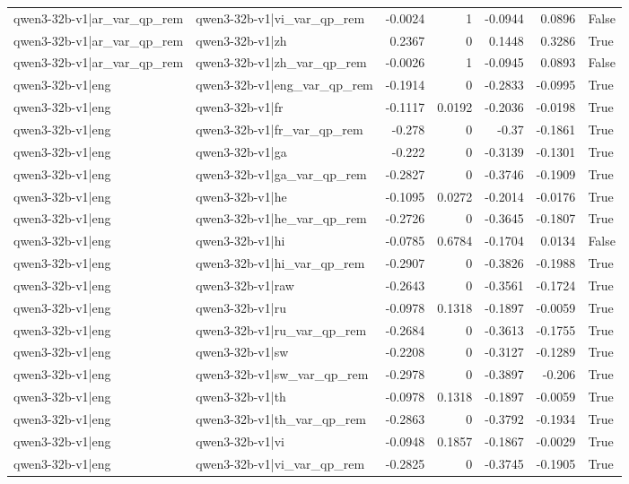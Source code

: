 \begin{table}
\begin{tabular}{l l r r r r l}
qwen3-32b-v1|ar_var_qp_rem & qwen3-32b-v1|vi_var_qp_rem & -0.0024 & 1 & -0.0944 & 0.0896 & False \\
qwen3-32b-v1|ar_var_qp_rem & qwen3-32b-v1|zh & 0.2367 & 0 & 0.1448 & 0.3286 & True \\
qwen3-32b-v1|ar_var_qp_rem & qwen3-32b-v1|zh_var_qp_rem & -0.0026 & 1 & -0.0945 & 0.0893 & False \\
qwen3-32b-v1|eng & qwen3-32b-v1|eng_var_qp_rem & -0.1914 & 0 & -0.2833 & -0.0995 & True \\
qwen3-32b-v1|eng & qwen3-32b-v1|fr & -0.1117 & 0.0192 & -0.2036 & -0.0198 & True \\
qwen3-32b-v1|eng & qwen3-32b-v1|fr_var_qp_rem & -0.278 & 0 & -0.37 & -0.1861 & True \\
qwen3-32b-v1|eng & qwen3-32b-v1|ga & -0.222 & 0 & -0.3139 & -0.1301 & True \\
qwen3-32b-v1|eng & qwen3-32b-v1|ga_var_qp_rem & -0.2827 & 0 & -0.3746 & -0.1909 & True \\
qwen3-32b-v1|eng & qwen3-32b-v1|he & -0.1095 & 0.0272 & -0.2014 & -0.0176 & True \\
qwen3-32b-v1|eng & qwen3-32b-v1|he_var_qp_rem & -0.2726 & 0 & -0.3645 & -0.1807 & True \\
qwen3-32b-v1|eng & qwen3-32b-v1|hi & -0.0785 & 0.6784 & -0.1704 & 0.0134 & False \\
qwen3-32b-v1|eng & qwen3-32b-v1|hi_var_qp_rem & -0.2907 & 0 & -0.3826 & -0.1988 & True \\
qwen3-32b-v1|eng & qwen3-32b-v1|raw & -0.2643 & 0 & -0.3561 & -0.1724 & True \\
qwen3-32b-v1|eng & qwen3-32b-v1|ru & -0.0978 & 0.1318 & -0.1897 & -0.0059 & True \\
qwen3-32b-v1|eng & qwen3-32b-v1|ru_var_qp_rem & -0.2684 & 0 & -0.3613 & -0.1755 & True \\
qwen3-32b-v1|eng & qwen3-32b-v1|sw & -0.2208 & 0 & -0.3127 & -0.1289 & True \\
qwen3-32b-v1|eng & qwen3-32b-v1|sw_var_qp_rem & -0.2978 & 0 & -0.3897 & -0.206 & True \\
qwen3-32b-v1|eng & qwen3-32b-v1|th & -0.0978 & 0.1318 & -0.1897 & -0.0059 & True \\
qwen3-32b-v1|eng & qwen3-32b-v1|th_var_qp_rem & -0.2863 & 0 & -0.3792 & -0.1934 & True \\
qwen3-32b-v1|eng & qwen3-32b-v1|vi & -0.0948 & 0.1857 & -0.1867 & -0.0029 & True \\
qwen3-32b-v1|eng & qwen3-32b-v1|vi_var_qp_rem & -0.2825 & 0 & -0.3745 & -0.1905 & True \\

\end{tabular}
\end{table}
